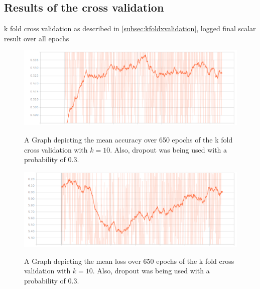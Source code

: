 \subsection{Results of the cross validation}
\label{subsec:xvalidationresults}
k fold cross validation as described in \ref{subsec:kfoldxvalidation}, logged final scalar result over all epochs
\begin{figure}[!ht]
	\caption{A Graph depicting the mean accuracy over 650 epochs of the k fold cross validation with $k=10$. Also, dropout was being used with a probability of 0.3. }
	\includegraphics[width=0.95\linewidth]{images/evaluation/650-epochs-k-crossvalidation-accuracy-mean.png}
	\label{fig:acc650epochs}
\end{figure}
\begin{figure}[!ht]
	\caption{A Graph depicting the mean loss over 650 epochs of the k fold cross validation with $k=10$. Also, dropout was being used with a probability of 0.3. }
	\includegraphics[width=0.95\linewidth]{images/evaluation/650-epochs-k-crossvalidation-loss-mean.png}
	\label{fig:loss650epochs}
\end{figure}

